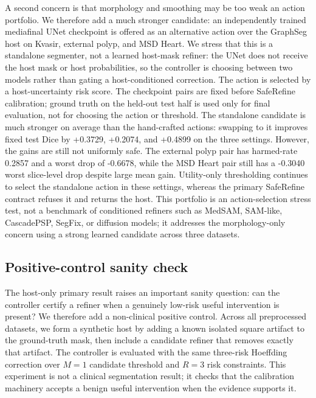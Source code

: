 \documentclass[preprint,12pt]{elsarticle}
\begin{document}
A second concern is that morphology and smoothing may be too weak an action
portfolio. We therefore add a much stronger candidate: an independently trained
mediafinal UNet checkpoint is offered as an alternative action over the GraphSeg
host on Kvasir, external polyp, and MSD Heart. We stress that this is a
standalone segmenter, not a learned host-mask refiner: the UNet does not receive
the host mask or host probabilities, so the controller is choosing between two
models rather than gating a host-conditioned correction. The action is selected
by a host-uncertainty risk score. The checkpoint pairs are fixed before
SafeRefine calibration; ground truth on the held-out test half is used only for
final evaluation, not for choosing the action or threshold. The standalone
candidate is much stronger on average than the hand-crafted actions: swapping to
it improves fixed test Dice by +0.3729, +0.2074, and +0.4899 on the three
settings. However, the gains are still not uniformly safe. The external polyp
pair has harmed-rate 0.2857 and a worst drop of -0.6678, while the MSD Heart
pair still has a -0.3040 worst slice-level drop despite large mean gain.
Utility-only thresholding continues to select the standalone action in these
settings, whereas the primary SafeRefine contract refuses it and returns the
host. This portfolio is an action-selection stress test, not a benchmark of
conditioned refiners such as MedSAM, SAM-like, CascadePSP, SegFix, or diffusion
models; it addresses the morphology-only concern using a strong learned
candidate across three datasets.



\subsection{Positive-control sanity check}

The host-only primary result raises an important sanity question: can the
controller certify a refiner when a genuinely low-risk useful intervention is
present? We therefore add a non-clinical positive control. Across all
preprocessed datasets, we form a synthetic host by adding a known isolated
square artifact to the ground-truth mask, then include a candidate refiner that
removes exactly that artifact. The controller is evaluated with the same
three-risk Hoeffding correction over $M=1$ candidate threshold and $R=3$ risk
constraints. This experiment is not a clinical segmentation result; it checks
that the calibration machinery accepts a benign useful intervention when the
evidence supports it.
\end{document}
